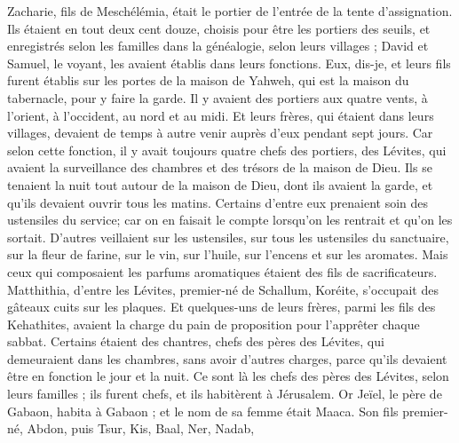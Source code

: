 \begin{multicols}{2}
Zacharie, fils de Meschélémia, était le portier de l'entrée de la tente d'assignation.
Ils étaient en tout deux cent douze, choisis pour être les portiers des seuils, et enregistrés selon les familles dans la généalogie, selon leurs villages ; David et Samuel, le voyant, les avaient établis dans leurs fonctions.
Eux, dis-je, et leurs fils furent établis sur les portes de la maison de Yahweh, qui est la maison du tabernacle, pour y faire la garde.
Il y avaient des portiers aux quatre vents, à l'orient, à l'occident, au nord et au midi.
Et leurs frères, qui étaient dans leurs villages, devaient de temps à autre venir auprès d’eux pendant sept jours.
Car selon cette fonction, il y avait toujours quatre chefs des portiers, des Lévites, qui avaient la surveillance des chambres et des trésors de la maison de Dieu.
Ils se tenaient la nuit tout autour de la maison de Dieu, dont ils avaient la garde, et qu’ils devaient ouvrir tous les matins.
Certains d’entre eux prenaient soin des ustensiles du service; car on en faisait le compte lorsqu'on les rentrait et qu'on les sortait.
D’autres veillaient sur les ustensiles, sur tous les ustensiles du sanctuaire, sur la fleur de farine, sur le vin, sur l'huile, sur l'encens et sur les aromates.
Mais ceux qui composaient les parfums aromatiques étaient des fils de sacrificateurs.
Matthithia, d'entre les Lévites, premier-né de Schallum, Koréite, s’occupait des gâteaux cuits sur les plaques.
Et quelques-uns de leurs frères, parmi les fils des Kehathites, avaient la charge du pain de proposition  pour l'apprêter chaque sabbat.
Certains étaient des chantres, chefs des pères des Lévites, qui demeuraient dans les chambres, sans avoir d’autres charges, parce qu'ils devaient être en fonction le jour et la nuit.
Ce sont là les chefs des pères des Lévites, selon leurs familles ; ils furent chefs, et ils habitèrent à Jérusalem.
Or Jeïel, le père de Gabaon, habita à Gabaon ; et le nom de sa femme était Maaca.
Son fils premier-né, Abdon, puis Tsur, Kis, Baal, Ner, Nadab,

\end{multicols}
